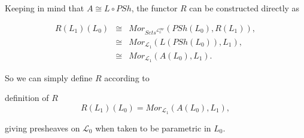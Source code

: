 \begin{frame}
Keeping in mind that $A \cong L \circ PSh$, the functor $R$ can be constructed directly as
\begin{block}{}
\setlength\abovedisplayskip{0pt}
\begin{eqnarray*}
R(L_1)(L_0) & \cong & Mor_{\textit{Sets}^{\mathcal{L}_0^{opp}}}(PSh( L_0),R(L_1)),\\
		    & \cong & Mor_{\mathcal{L}_1}(L(PSh(L_0)),L_1),\\
   		    & \cong & Mor_{\mathcal{L}_1}(A(L_0),L_1).
\end{eqnarray*}
\end{block}
So we can simply define $R$ according to
\begin{block}{definition of $R$}
$$
R(L_1)(L_0) = Mor_{\mathcal{L}_1}(A(L_0),L_1),
$$
\end{block}
giving presheaves on $\mathcal{L}_0$ when taken to be parametric in $L_0$.
\end{frame}